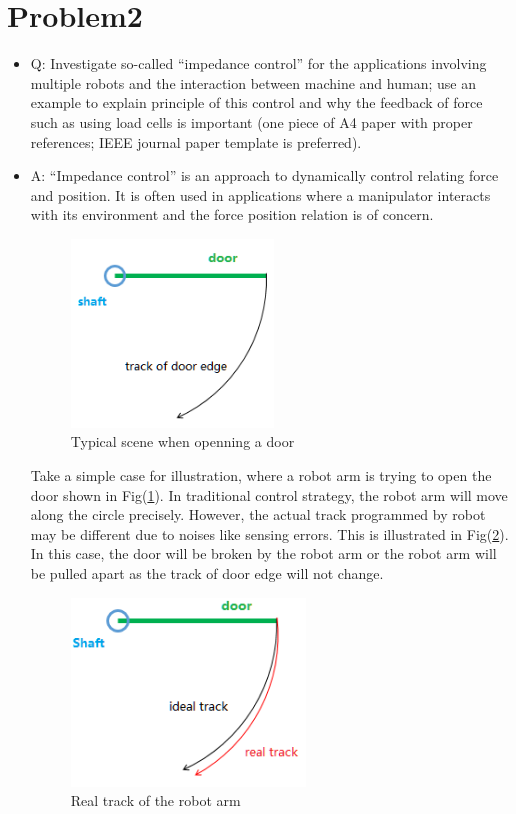 \documentclass[paper=a4, fontsize=11pt]{scrartcl} %
\numberwithin{equation}{section} %
\numberwithin{figure}{section} %
\numberwithin{table}{section} %
\begin{document}
\section*{Problem2}
	\begin{itemize}
		\item 
			Q: Investigate so-called ``impedance control'' for the applications involving multiple robots and the interaction between machine and human; use an example to explain principle of this control and why the feedback of force such as using load cells is important (one piece of A4 paper with proper references; IEEE journal paper template is preferred).
		
		\item 
			A: ``Impedance control'' is an approach to dynamically control relating force and position. It is often used in applications where a manipulator interacts with its environment and the force position relation is of concern.
			
			\begin{figure}[!ht]
				\centering
				\includegraphics[height=5cm]{../pic/door.png}
				\caption{Typical scene when openning a door}
				\label{fig:door}
			\end{figure}
		
			Take a simple case for illustration, where a robot arm is trying to open the door shown in Fig(\ref{fig:door}). In traditional control strategy, the robot arm will move along the circle precisely. However, the actual track programmed by robot may be different due to noises like sensing errors. This is illustrated in Fig(\ref{fig:track}). In this case, the door will be broken by the robot arm or the robot arm will be pulled apart as the track of door edge will not change.
			 
			\begin{figure}[!ht]
				\centering
				\includegraphics[height=5cm]{../pic/track.png}
				\caption{Real track of the robot arm}
				\label{fig:track}
			\end{figure}			
			

\end{itemize}
\end{document}
